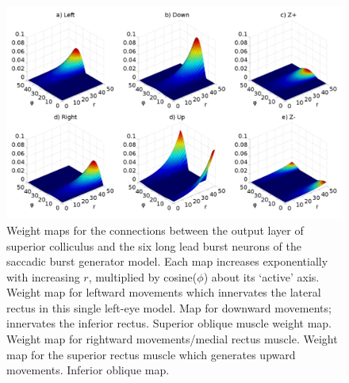 \documentclass{frontiersSCNS}
\begin{document}
\begin{figure}[!ht]
\begin{center}
\includegraphics[width=\textwidth]{./figures/weightmaps.png}
\end{center}
\caption{ Weight maps for the connections between the output layer of superior
colliculus and the six long lead burst neurons of the saccadic burst
generator model. Each map increases exponentially with increasing $r$,
multiplied by cosine($\phi$) about its `active' axis.  Weight
map for leftward movements which innervates the lateral rectus in this
single left-eye model.  Map for downward movements; innervates
the inferior rectus.  Superior oblique muscle weight
map.  Weight map for rightward movements/medial rectus
muscle.  Weight map for the superior rectus muscle which
generates upward movements.  Inferior oblique map.}
\label{fig:weightmaps}
\end{figure}
\end{document}
